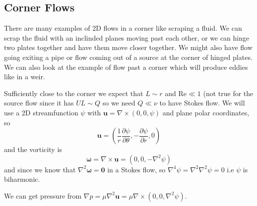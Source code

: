 \documentclass{article}
\begin{document}
\subsection{Corner Flows}
There are many examples of 2D flows in a corner like scraping a fluid. We can scrap the fluid with an inclinded planes moving past each other, or we can hinge two plates together and have them move closer together. We might also have flow going exiting a pipe or flow coming out of a source at the corner of hinged plates. We can also look at the example of flow past a corner which will produce eddies like in a weir.\par
Sufficiently close to the corner we expect that $ L\sim r $ and $ \mathrm{Re} \ll 1 $ (not true for the source flow since it has $ UL\sim Q $ so we need $ Q\ll \nu $ to have Stokes flow. We will use a 2D streamfunction $ \psi $ with $ \mathbf u = \nabla\times (0,0,\psi) $ and plane polar coordinates, so
\[
	\mathbf u = \left(\frac 1r \frac{\partial\psi}{\partial \theta}, -\frac{\partial \psi}{\partial r}, 0\right)
\]
and the vorticity is
\[
  \boldsymbol\omega = \nabla\times \mathbf u = (0,0,-\nabla^2 \psi)
\]
and since we know that $ \nabla^2 \boldsymbol\omega = \mathbf 0 $ in a Stokes flow, so $ \nabla^4 \psi = \nabla^2\nabla^2 \psi = 0 $ i.e $ \psi $ is biharmonic.\par
We can get pressure from $ \nabla p = \mu \nabla^2 \mathbf u = \mu \nabla \times(0,0,\nabla^2\psi) $.
\end{document}
